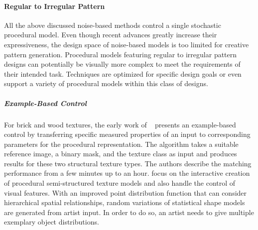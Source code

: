 \paragraph{Regular to Irregular Pattern}
\label{para:analysis_distribution_and_repetition_regular}

All the above discussed noise-based methods control a single stochastic procedural model. Even though recent advances greatly increase their expressiveness, the design space of noise-based models is too limited for creative pattern generation. Procedural models featuring regular to irregular pattern designs can potentially be visually more complex to meet the requirements of their intended task. Techniques are optimized for specific design goals or even support a variety of procedural models within this class of designs.

\subparagraph{Example-Based Control}
\label{subpara:analysis_regular_examplebased_control}

For brick and wood textures, the early work of \citeauthor*{lefebvre_2000_ass}~\cite{lefebvre_2000_ass} presents an example-based control by transferring specific measured properties of an input to corresponding parameters for the procedural representation. The algorithm takes a suitable reference image, a binary mask, and the texture class as input and produces results for these two structural texture types. The authors describe the matching performance from a few minutes up to an hour. \cite{gilet_2012_map} focus on the interactive creation of procedural semi-structured texture models and also handle the control of visual features. With an improved point distribution function that can consider hierarchical spatial relationships, random variations of statistical shape models are generated from artist input. In order to do so, an artist needs to give multiple exemplary object distributions. 

